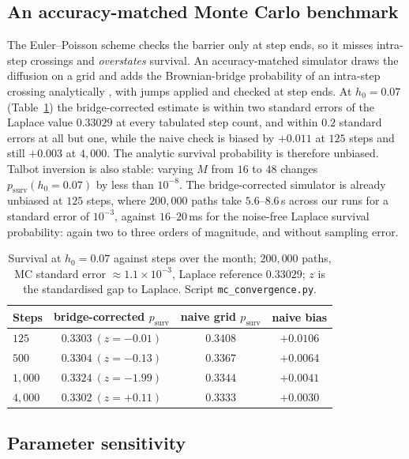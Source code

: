 \documentclass[11pt]{article}
\theoremstyle{plain}
\theoremstyle{definition}
\theoremstyle{remark}
\begin{document}
\subsection{An accuracy-matched Monte Carlo benchmark}\label{sec:mc-benchmark}
The Euler--Poisson scheme checks the barrier only at step ends, so it misses intra-step crossings and
\emph{overstates} survival. An accuracy-matched simulator draws the diffusion on a grid and adds the
Brownian-bridge probability of an intra-step crossing analytically \citep{Glasserman2004}, with jumps
applied and checked at step ends. At $h_0=0.07$ (Table~\ref{tab:mcconv}) the bridge-corrected
estimate is within two standard errors of the Laplace value $0.33029$ at every tabulated step
count, and within $0.2$ standard errors at all but one, while the naive check is biased by $+0.011$ at $125$ steps and still
$+0.003$ at $4{,}000$. The analytic survival probability is therefore unbiased. Talbot inversion is
also stable: varying $M$ from $16$ to $48$ changes $p_{\mathrm{surv}}(h_0{=}0.07)$ by less than
$10^{-8}$. The bridge-corrected simulator is already unbiased at $125$ steps, where $200{,}000$ paths take
$5.6$--$8.6$\,s across our runs for a standard error of $10^{-3}$, against $16$--$20$\,ms for the
noise-free Laplace survival probability: again two to three orders of magnitude, and without sampling
error.

\begin{table}[ht]
\centering\small
\begin{tabular}{lccc}
\toprule
Steps & bridge-corrected $p_{\mathrm{surv}}$ & naive grid $p_{\mathrm{surv}}$ & naive bias \\
\midrule
$125$   & $0.3303\ (z{=}{-}0.01)$ & $0.3408$ & $+0.0106$ \\
$500$   & $0.3304\ (z{=}{-}0.13)$ & $0.3367$ & $+0.0064$ \\
$1{,}000$ & $0.3324\ (z{=}{-}1.99)$ & $0.3344$ & $+0.0041$ \\
$4{,}000$ & $0.3302\ (z{=}{+}0.11)$ & $0.3333$ & $+0.0030$ \\
\bottomrule
\end{tabular}
\caption{Survival at $h_0=0.07$ against steps over the month; $200{,}000$ paths, MC standard error
${\approx}1.1\times10^{-3}$, Laplace reference $0.33029$; $z$ is the standardised gap to Laplace.
Script \texttt{mc\_convergence.py}.}
\label{tab:mcconv}
\end{table}

\subsection{Parameter sensitivity}\label{sec:sensitivity}
\end{document}
